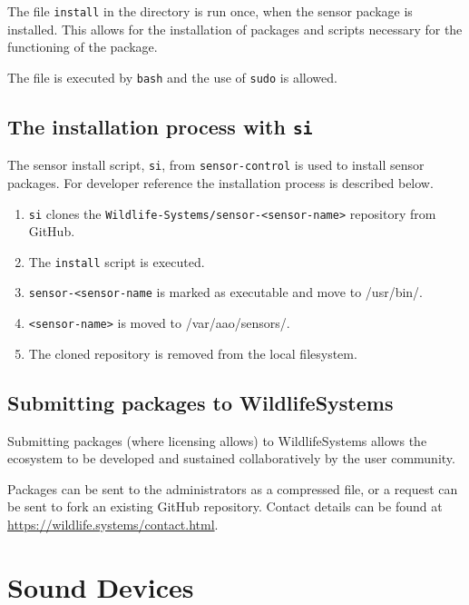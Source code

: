 \documentclass[
]{book}
\begin{document}
The file \texttt{install} in the directory is run once, when the sensor package is installed. This allows for the installation of packages and scripts necessary for the functioning of the package.

The file is executed by \texttt{bash} and the use of \texttt{sudo} is allowed.

\hypertarget{the-installation-process-with-si}{%
\section{\texorpdfstring{The installation process with \texttt{si}}{The installation process with si}}\label{the-installation-process-with-si}}

The sensor install script, \texttt{si}, from \texttt{sensor-control} is used to install sensor packages. For developer reference the installation process is described below.

\begin{enumerate}
\def\labelenumi{\arabic{enumi}.}
\item
  \texttt{si} clones the \texttt{Wildlife-Systems/sensor-\textless{}sensor-name\textgreater{}} repository from GitHub.
\item
  The \texttt{install} script is executed.
\item
  \texttt{sensor-\textless{}sensor-name} is marked as executable and move to /usr/bin/.
\item
  \texttt{\textless{}sensor-name\textgreater{}} is moved to /var/aao/sensors/.
\item
  The cloned repository is removed from the local filesystem.
\end{enumerate}

\hypertarget{submitting-packages-to-wildlifesystems}{%
\section{Submitting packages to WildlifeSystems}\label{submitting-packages-to-wildlifesystems}}

Submitting packages (where licensing allows) to WildlifeSystems allows the ecosystem to be developed and sustained collaboratively by the user community.

Packages can be sent to the administrators as a compressed file, or a request can be sent to fork an existing GitHub repository. Contact details can be found at \url{https://wildlife.systems/contact.html}.

\hypertarget{sound-devices}{%
\chapter{Sound Devices}\label{sound-devices}}
\end{document}
